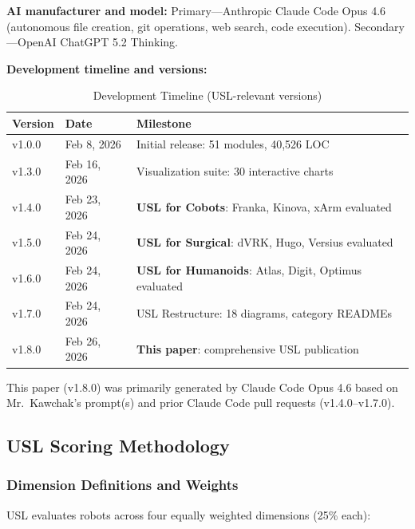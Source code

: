 \documentclass[11pt,a4paper]{article}
\begin{document}
\textbf{AI manufacturer and model:} Primary---Anthropic Claude Code Opus 4.6 (autonomous file creation, git operations, web search, code execution). Secondary---OpenAI ChatGPT 5.2 Thinking.

\textbf{Development timeline and versions:}

\begin{table}[H]
\centering
\caption{Development Timeline (USL-relevant versions)}
\label{tab:timeline}
\small
\begin{tabularx}{\textwidth}{l l X}
\toprule
\textbf{Version} & \textbf{Date} & \textbf{Milestone} \\
\midrule
v1.0.0 & Feb 8, 2026 & Initial release: 51 modules, 40,526 LOC \\
v1.3.0 & Feb 16, 2026 & Visualization suite: 30 interactive charts \\
v1.4.0 & Feb 23, 2026 & \textbf{USL for Cobots}: Franka, Kinova, xArm evaluated \\
v1.5.0 & Feb 24, 2026 & \textbf{USL for Surgical}: dVRK, Hugo, Versius evaluated \\
v1.6.0 & Feb 24, 2026 & \textbf{USL for Humanoids}: Atlas, Digit, Optimus evaluated \\
v1.7.0 & Feb 24, 2026 & USL Restructure: 18 diagrams, category READMEs \\
v1.8.0 & Feb 26, 2026 & \textbf{This paper}: comprehensive USL publication \\
\bottomrule
\end{tabularx}
\end{table}

This paper (v1.8.0) was primarily generated by Claude Code Opus 4.6 based on Mr.\ Kawchak's prompt(s) and prior Claude Code pull requests (v1.4.0--v1.7.0).

\subsection{USL Scoring Methodology}

\subsubsection{Dimension Definitions and Weights}
USL evaluates robots across four equally weighted dimensions (25\% each):
\end{document}
